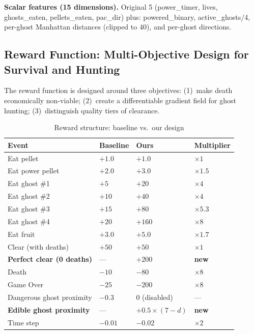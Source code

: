 \documentclass[11pt,a4paper]{article}
\theoremstyle{definition}
\begin{document}
\textbf{Scalar features (15 dimensions).}
Original 5 (power\_timer, lives, ghosts\_eaten, pellets\_eaten, pac\_dir) plus:
powered\_binary, active\_ghosts$/$4, per-ghost Manhattan distances (clipped to 40), and per-ghost directions.

\subsection{Reward Function: Multi-Objective Design for Survival and Hunting}

The reward function is designed around three objectives:
(1)~make death economically non-viable;
(2)~create a differentiable gradient field for ghost hunting;
(3)~distinguish quality tiers of clearance.

\begin{table}[ht]
\centering
\small
\caption{Reward structure: baseline vs.\ our design}
\label{tab:rewards}
\begin{tabular}{@{}p{3.5cm}p{2.2cm}p{2.2cm}p{2.2cm}@{}}
\toprule
\textbf{Event} & \textbf{Baseline} & \textbf{Ours} & \textbf{Multiplier} \\
\midrule
Eat pellet & $+1.0$ & $+1.0$ & $\times1$ \\
Eat power pellet & $+2.0$ & $+3.0$ & $\times1.5$ \\
Eat ghost \#1 & $+5$ & $+20$ & $\times4$ \\
Eat ghost \#2 & $+10$ & $+40$ & $\times4$ \\
Eat ghost \#3 & $+15$ & $+80$ & $\times5.3$ \\
Eat ghost \#4 & $+20$ & $+160$ & $\times8$ \\
Eat fruit & $+3.0$ & $+5.0$ & $\times1.7$ \\
Clear (with deaths) & $+50$ & $+50$ & $\times1$ \\
\textbf{Perfect clear (0 deaths)} & --- & \textbf{$+200$} & \textbf{new} \\
Death & $-10$ & \textbf{$-80$} & \textbf{$\times8$} \\
Game Over & $-25$ & $-200$ & $\times8$ \\
Dangerous ghost proximity & $-0.3$ & $0$ (disabled) & --- \\
\textbf{Edible ghost proximity} & --- & \textbf{$+0.5\!\times\!(7\!-\!d)$} & \textbf{new} \\
Time step & $-0.01$ & $-0.02$ & $\times2$ \\
\bottomrule
\end{tabular}
\end{table}
\end{document}

